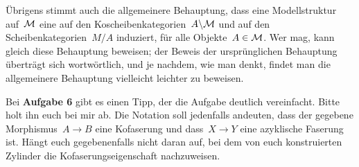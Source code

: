 \documentclass{uebblatt}
\begin{document}
Übrigens stimmt auch die allgemeinere Behauptung, dass eine Modellstruktur
auf~$\mathcal{M}$ eine auf den Koscheibenkategorien~$A \backslash \mathcal{M}$ und auf den
Scheibenkategorien~$M/A$ induziert, für alle Objekte~$A \in \mathcal{M}$. Wer mag, kann
gleich diese Behauptung beweisen; der Beweis der ursprünglichen Behauptung
überträgt sich wortwörtlich, und je nachdem, wie man denkt, findet man die
allgemeinere Behauptung vielleicht leichter zu beweisen.

Bei \textbf{Aufgabe 6} gibt es einen Tipp, der die Aufgabe deutlich vereinfacht.
Bitte holt ihn euch bei mir ab. Die Notation soll jedenfalls andeuten, dass der
gegebene Morphismus~$A \to B$ eine Kofaserung und dass~$X \to Y$ eine
azyklische Faserung ist. Hängt euch gegebenenfalls nicht daran auf, bei dem von
euch konstruierten Zylinder die Kofaserungseigenschaft nachzuweisen.
\end{document}
